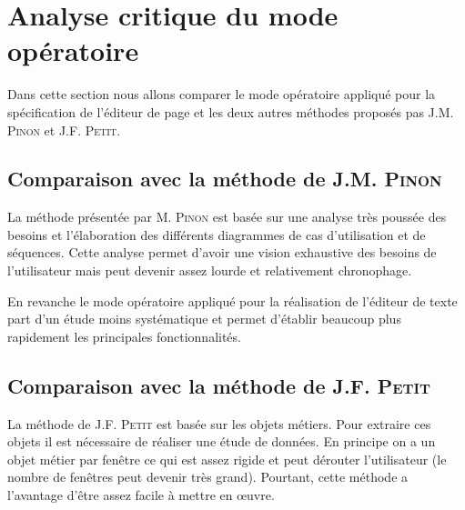 \section{Analyse critique du mode opératoire}
Dans cette section nous allons comparer le mode opératoire appliqué pour la spécification de l'éditeur de page et les deux autres méthodes proposés pas J.M. \textsc{Pinon} et J.F. \textsc{Petit}.

\subsection{Comparaison avec la méthode de J.M. \textsc{Pinon}}
La méthode présentée par M. \textsc{Pinon} est basée sur une analyse très poussée des besoins et l'élaboration des différents diagrammes de cas d'utilisation et de séquences. Cette analyse permet d'avoir une vision exhaustive des besoins de l'utilisateur mais peut devenir assez lourde et relativement chronophage. 
	
En revanche le mode opératoire appliqué pour la réalisation de l'éditeur de texte part d'un étude moins systématique et permet d'établir beaucoup plus rapidement les principales fonctionnalités.

\subsection{Comparaison avec la méthode de J.F. \textsc{Petit}}
La méthode de J.F. \textsc{Petit} est basée sur les objets métiers. Pour extraire ces objets il est nécessaire de réaliser une étude de données. En principe on a un objet métier par fenêtre ce qui est assez rigide et peut dérouter l'utilisateur (le nombre de fenêtres peut devenir très grand).  Pourtant, cette méthode a l'avantage d'être assez facile à mettre en œuvre.
